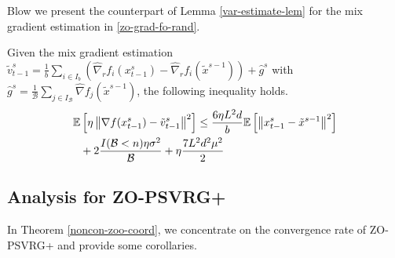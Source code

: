 Blow we present the counterpart of Lemma \ref{var-estimate-lem} for the mix gradient estimation in \eqref{zo-grad-fo-rand}.
\begin{lemma}\label{RandSGE-var-estimate-lem}
Given the mix gradient estimation $\tilde{v}_{t-1}^s = \frac{1}{b} \sum_{i\in I_b}\left(\hat{\nabla}_r f_{i}(x_{t-1}^s)-\hat{\nabla}_r f_{i}(\tilde{x}^{s-1})\right)+\hat{g}^s$ with $\hat{g}^s = \frac{1}{\mathcal{B}} \sum_{j\in I_{\mathcal{B}}} \hat{\nabla} f_j (\tilde{x}^{s-1})$, the following inequality holds. 
\begin{align}
\mathbb{E}&\left[\eta\left\lVert\nabla f(x_{t-1}^s)-{\tilde{v}_{t-1}^s}\right\rVert^2\right] \leq  \frac{6\eta L^2 d}{b}\mathbb{E}\left[\left\lVert x_{t-1}^s-\tilde{x}^{s-1}\right\rVert^2\right]\notag\\
&+ 2\frac{I(\mathcal{B} < n)\eta \sigma ^2}{\mathcal{B}}+\eta \frac{7L^2 d^2 \mu^2}{2}
\end{align}
\end{lemma}
\subsection{Analysis for ZO-PSVRG+}
In Theorem \ref{noncon-zoo-coord}, we concentrate on the convergence rate of ZO-PSVRG+ and provide some corollaries.

